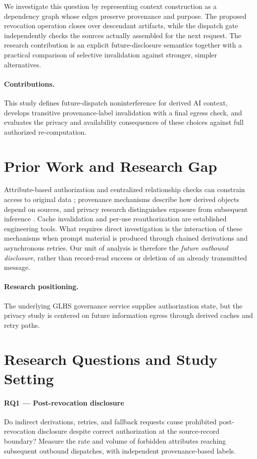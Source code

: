 \documentclass[11pt,a4paper]{article}
\begin{document}
We investigate this question by representing context construction as a dependency graph whose edges preserve provenance and purpose. The proposed revocation operation closes over descendant artifacts, while the dispatch gate independently checks the sources actually assembled for the next request. The research contribution is an explicit future-disclosure semantics together with a practical comparison of selective invalidation against stronger, simpler alternatives.

\paragraph{Contributions.} This study defines future-dispatch noninterference for derived AI context, develops transitive provenance-label invalidation with a final egress check, and evaluates the privacy and availability consequences of these choices against full authorized re-computation.

\section{Prior Work and Research Gap}
Attribute-based authorization and centralized relationship checks can constrain access to original data \cite{hu2014,sandhu1996}; provenance mechanisms describe how derived objects depend on sources, and privacy research distinguishes exposure from subsequent inference \cite{shokri2017,dwork2014}. Cache invalidation and per-use reauthorization are established engineering tools. What requires direct investigation is the interaction of these mechanisms when prompt material is produced through chained derivations and asynchronous retries. Our unit of analysis is therefore the \emph{future outbound disclosure}, rather than record-read success or deletion of an already transmitted message.

\paragraph{Research positioning.} The underlying GLHS governance service supplies authorization state, but the privacy study is centered on future information egress through derived caches and retry paths.

\section{Research Questions and Study Setting}
\paragraph{RQ1 — Post-revocation disclosure} Do indirect derivations, retries, and fallback requests cause prohibited post-revocation disclosure despite correct authorization at the source-record boundary? Measure the rate and volume of forbidden attributes reaching subsequent outbound dispatches, with independent provenance-based labels.
\end{document}
